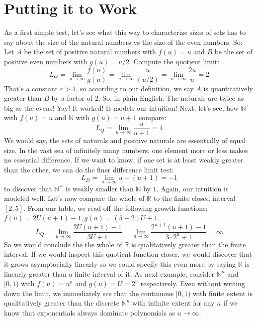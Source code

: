 \documentclass[12pt]{article}
\begin{document}
\section{Putting it to Work}
As a first simple test, let's see what this way to characterize sizes of sets has to say about the size of the natural numbers vs the size of the even numbers. So: Let $A$ be the set of positive natural numbers with $f(u) = u$ and $B$ be the set of positive even numbers with $g(u) = u/2$. Compute the quotient limit: 
\begin{equation}
 L_Q = \lim_{u \rightarrow \infty}	\frac{f(u)}{g(u)}
   	= \lim_{u \rightarrow \infty}	\frac{u}{(u/2)}
   	= \lim_{u \rightarrow \infty}	\frac{2u}{u}     	
   	= 2
\end{equation}
That's a constant $r > 1$, so according to our definition, we say $A$ is quantitatively greater than $B$ by a factor of 2. So, in plain English: The naturals are twice as big as the evens! Yay! It worked! It models our intuition! Next, let's see, how $\mathbb{N}^+$ with $f(u) = u$ and $\mathbb{N}$ with $g(u) = u+1$ compare:
\begin{equation}
 L_Q = \lim_{u \rightarrow \infty}	\frac{u}{u+1} = 1
\end{equation}
We would say, the sets of naturals and positive naturals are essentially of equal size. In the vast sea of infinitely many numbers, one element more or less makes no essential difference. If we want to know, if one set is at least weakly greater than the other, we can do the finer difference limit test:
\begin{equation}
	L_D = \lim_{u \rightarrow \infty} u - (u+1) = -1
\end{equation}
to discover that $\mathbb{N}^+$ is weakly smaller than $\mathbb{N}$ by $1$. Again, our intuition is modeled well. Let's now compare the whole of $\mathbb{R}$ to the finite closed interval $[2,5]$. From our table, we read off the following growth functions: $f(u) = 2 U (u+1) - 1, g(u) = (5-2) U +1$.
\begin{equation}
L_Q = \lim_{u \rightarrow \infty} \frac{2 U (u+1) - 1}{3 U +1}
    = \lim_{u \rightarrow \infty} \frac{2^{u+1} (u+1) - 1}{3 \cdot 2^u +1} = \infty	
\end{equation}
So we would conclude the the whole of $\mathbb{R}$ is qualitatively greater than the finite interval. If we would inspect this quotient function closer, we would discover that it grows asymptocially linearly so we could specify this even more by saying  $\mathbb{R}$ is linearly greater than a finite interval of it. As next example, consider $\mathbb{N}^n$ and $[0,1)$ with $f(u) = u^n$ and $g(u) = U = 2^u$ respectively. Even without writing down the limit, we immediately see that the continuous $[0,1)$ with finite extent is qualitatively greater than the discrete $\mathbb{N}^n$ with infinite extent for any $n$ if we know that exponentials always dominate polynomials as $u \rightarrow \infty$.
\end{document}
